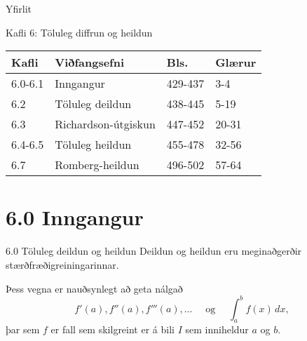 \date{11, 18, 20, 25~og 27.~febrúar}



\begin{frame}
	\maketitle
\end{frame}

\begin{frame}{Yfirlit}
\begin{block}{Kafli 6: Töluleg diffrun og heildun}
\begin{center}
\begin{tabular}{|l|l|l|l|}\hline
  Kafli & Viðfangsefni & Bls. & Glærur\\
  \hline
  6.0-6.1 &Inngangur		& 429-437 & 3-4\\
  6.2 &Töluleg deildun		& 438-445 & 5-19\\
  6.3 &Richardson-útgiskun	& 447-452 & 20-31\\
  6.4-6.5 &Töluleg heildun	& 455-478 & 32-56\\
  6.7 &Romberg-heildun		& 496-502 & 57-64\\
\hline
\end{tabular}
\end{center}
\end{block}
\end{frame}


\section*{6.0 Inngangur}

\begin{frame}{6.0 Töluleg deildun og heildun  }  
Deildun og heildun eru meginaðgerðir stærðfræðigreiningarinnar.

Þess vegna er nauðsynlegt að geta nálgað
\begin{equation*}
  f'(a),f''(a),f'''(a),\dots \quad 
  \text{ og } \quad
  \int_a^b f(x)\, dx,
\end{equation*}
þar sem $f$ er fall sem skilgreint er á bili $I$ sem inniheldur $a$ og $b$.  
\end{frame}



